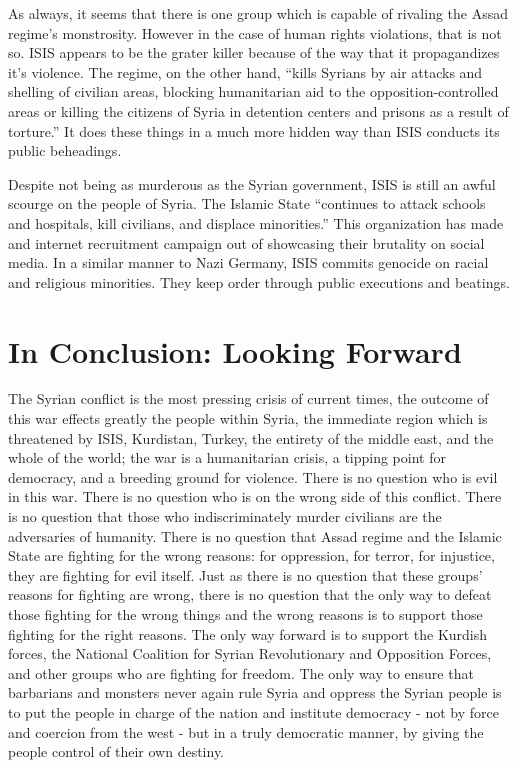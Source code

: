 \documentclass[a4paper,titlepage,12pt]{turabian-researchpaper}
\begin{document}
As always, it seems that there is one group which is capable of rivaling the
Assad regime's monstrosity. However in the case of human rights violations,
that is not so. ISIS appears to be the grater killer because of the way that it
propagandizes it's violence. The regime, on the other hand, ``kills Syrians by
air attacks and shelling of civilian areas,
blocking humanitarian aid to the
opposition-controlled areas or killing
the citizens of Syria in detention centers
and prisons as a result of torture.'' It does these things in a much more
hidden way than ISIS conducts its public beheadings. \autocite{human}

Despite not being as murderous as the Syrian government, ISIS is still an awful
scourge on the people of Syria. The Islamic State ``continues to attack schools
and hospitals, kill civilians, and displace minorities.'' \autocite[20]{isis}
This organization has made and internet recruitment campaign out of showcasing
their brutality on social media. \autocite[8]{isis} In a similar manner to Nazi
Germany, ISIS commits genocide on racial and religious minorities. They keep
order through public executions and beatings. \autocite[2-3]{isis}

\section{In Conclusion: Looking Forward}

The Syrian conflict is the most pressing crisis of current times, the outcome
of this war effects greatly the people within Syria, the immediate region which
is threatened by ISIS, Kurdistan, Turkey, the entirety of the middle east, and
the whole of the world; the war is a humanitarian crisis, a tipping point for
democracy, and a breeding ground for violence. There is no question who is evil
in this war. There is no question who is on the wrong side of this conflict.
There is no question that those who indiscriminately murder civilians are the
adversaries of humanity. There is no question that Assad regime and the Islamic
State are fighting for the wrong reasons: for oppression, for terror, for
injustice, they are fighting for evil itself. Just as there is no question that
these groups' reasons for fighting are wrong, there is no question that the
only way to defeat those fighting for the wrong things and the wrong reasons is
to support those fighting for the right reasons. The only way forward is to
support the Kurdish forces, the National Coalition for Syrian Revolutionary and
Opposition Forces, and other groups who are fighting for freedom. The only way
to ensure that barbarians and monsters never again rule Syria and oppress the
Syrian people is to put the people in charge of the nation and institute
democracy - not by force and coercion from the west - but in a truly democratic
manner, by giving the people control of their own destiny.



\printbibliography
\end{document}
